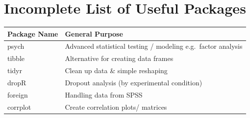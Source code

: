 \documentclass[
]{book}
\begin{document}
\section*{Incomplete List of Useful Packages}\label{lop}

\begin{longtable}[]{@{}ll@{}}
\toprule\noalign{}
Package Name & General Purpose \\
\midrule\noalign{}
\endhead
\bottomrule\noalign{}
\endlastfoot
psych & Advanced statistical testing / modeling e.g.~factor analysis \\
tibble & Alternative for creating data frames \\
tidyr & Clean up data \& simple reshaping \\
dropR & Dropout analysis (by experimental condition) \\
foreign & Handling data from SPSS \\
corrplot & Create correlation plots/ matrices \\
\end{longtable}

  
\end{document}
